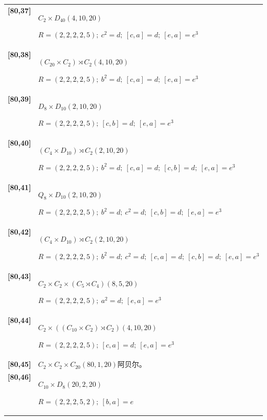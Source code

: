 \documentclass[UTF8,fontset=fandol,11pt,a4paper]{ctexart}
\begin{document}
\begin{longtable}{@{}p{17mm}>{\raggedright\arraybackslash}p{141mm}@{}}
\textbf{[80,37]} & $C_{2}\times D_{40}$\quad $(4,10,20)$\par\(R=(2,2,2,2,5);\allowbreak\ c^{2}=d;\allowbreak\ [c,a]=d;\allowbreak\ [e,a]=e^{3}\)\\[3pt]

\textbf{[80,38]} & $(C_{20}\times C_{2})\rtimes C_{2}$\quad $(4,10,20)$\par\(R=(2,2,2,2,5);\allowbreak\ b^{2}=d;\allowbreak\ [c,a]=d;\allowbreak\ [e,a]=e^{3}\)\\[3pt]

\textbf{[80,39]} & $D_{8}\times D_{10}$\quad $(2,10,20)$\par\(R=(2,2,2,2,5);\allowbreak\ [c,b]=d;\allowbreak\ [e,a]=e^{3}\)\\[3pt]

\textbf{[80,40]} & $(C_{4}\times D_{10})\rtimes C_{2}$\quad $(2,10,20)$\par\(R=(2,2,2,2,5);\allowbreak\ b^{2}=d;\allowbreak\ [c,a]=d;\allowbreak\ [c,b]=d;\allowbreak\ [e,a]=e^{3}\)\\[3pt]

\textbf{[80,41]} & $Q_{8}\times D_{10}$\quad $(2,10,20)$\par\(R=(2,2,2,2,5);\allowbreak\ b^{2}=d;\allowbreak\ c^{2}=d;\allowbreak\ [c,b]=d;\allowbreak\ [e,a]=e^{3}\)\\[3pt]

\textbf{[80,42]} & $(C_{4}\times D_{10})\rtimes C_{2}$\quad $(2,10,20)$\par\(R=(2,2,2,2,5);\allowbreak\ b^{2}=d;\allowbreak\ c^{2}=d;\allowbreak\ [c,a]=d;\allowbreak\ [c,b]=d;\allowbreak\ [e,a]=e^{3}\)\\[3pt]

\textbf{[80,43]} & $C_{2}\times C_{2}\times (C_{5}\rtimes C_{4})$\quad $(8,5,20)$\par\(R=(2,2,2,2,5);\allowbreak\ a^{2}=d;\allowbreak\ [e,a]=e^{3}\)\\[3pt]

\textbf{[80,44]} & $C_{2}\times ((C_{10}\times C_{2})\rtimes C_{2})$\quad $(4,10,20)$\par\(R=(2,2,2,2,5);\allowbreak\ [c,a]=d;\allowbreak\ [e,a]=e^{3}\)\\[3pt]

\textbf{[80,45]} & $C_{2}\times C_{2}\times C_{20}$\quad $(80,1,20)$\quad 阿贝尔。\\[3pt]

\textbf{[80,46]} & $C_{10}\times D_{8}$\quad $(20,2,20)$\par\(R=(2,2,2,5,2);\allowbreak\ [b,a]=e\)\\[3pt]


\end{longtable}
\end{document}

